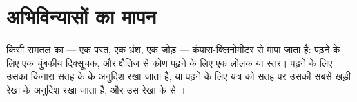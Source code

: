 \section{अभिविन्यासों का मापन}

किसी समतल का  --- एक परत, एक भ्रंश, एक जोड़ --- कंपास-क्लिनोमीटर से मापा जाता है:  पढ़ने के लिए
एक चुंबकीय दिक्सूचक, और क्षैतिज से कोण पढ़ने के लिए एक लोलक या स्तर।  पढ़ने के लिए उसका किनारा सतह के
 के अनुदिश रखा जाता है, या  पढ़ने के लिए यंत्र को सतह पर उसकी सबसे खड़ी रेखा के अनुदिश रखा जाता है,
और उस रेखा के  से ।

